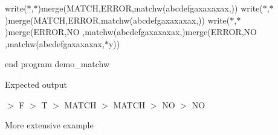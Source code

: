 write($\ast$,$\ast$)merge(\textquotesingle{}M\+A\+T\+CH\textquotesingle{},\textquotesingle{}E\+R\+R\+OR\textquotesingle{},matchw(\textquotesingle{}abcdefgaxaxaxax\textquotesingle{},\textquotesingle{})) write($\ast$,$\ast$)merge(\textquotesingle{}M\+A\+T\+CH\textquotesingle{},\textquotesingle{}E\+R\+R\+OR\textquotesingle{},matchw(\textquotesingle{}abcdefgaxaxaxax\textquotesingle{},\textquotesingle{})) write($\ast$,$\ast$)merge(\textquotesingle{}E\+R\+R\+OR\textquotesingle{},\textquotesingle{}NO \textquotesingle{},matchw(\textquotesingle{}abcdefgaxaxaxax\textquotesingle{},)merge(\textquotesingle{}E\+R\+R\+OR\textquotesingle{},\textquotesingle{}NO \textquotesingle{},matchw(\textquotesingle{}abcdefgaxaxaxax\textquotesingle{},\textquotesingle{}$\ast$y\textquotesingle{}))

end program demo\+\_\+matchw

Expected output

$>$ F $>$ T $>$ M\+A\+T\+CH $>$ M\+A\+T\+CH $>$ NO $>$ NO

More extensive example

